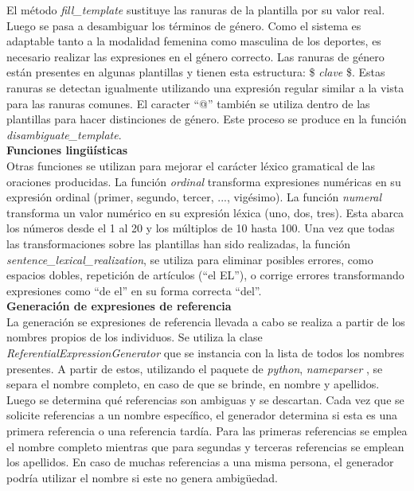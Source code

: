   El método \emph{fill\_template} sustituye las ranuras de la plantilla por su valor real. Luego se pasa a desambiguar los términos de género. Como el sistema es 
adaptable tanto a la modalidad femenina como masculina de los deportes, es necesario realizar las expresiones en el género correcto. Las ranuras de género están 
presentes en algunas plantillas y tienen esta estructura: \$ \textit{clave} \$. Estas ranuras se detectan igualmente utilizando una expresión regular similar a la vista 
para las ranuras comunes. El caracter “@” también se utiliza dentro de las plantillas para hacer distinciones de género. Este proceso se produce en la 
función \emph{disambiguate\_template}.\\

\textbf{Funciones lingüísticas}\\

    Otras funciones se utilizan para mejorar el carácter léxico gramatical de las oraciones producidas. La función \emph{ordinal} transforma expresiones numéricas 
en su expresión ordinal (primer, segundo,  tercer, ..., vigésimo). La función \emph{numeral} transforma un valor numérico en su expresión léxica (uno, dos, tres). Esta 
abarca los números desde el 1 al 20 y los múltiplos de 10 hasta 100. Una vez que todas las transformaciones sobre las plantillas han sido realizadas, la función 
\emph{sentence\_lexical\_realization}, se utiliza para eliminar posibles errores, como espacios dobles, repetición de artículos (“el EL”), o corrige errores 
transformando expresiones como “de el” en su forma correcta “del”.\\


\textbf{Generación de expresiones de referencia}\\

    La generación se expresiones de referencia llevada a cabo se realiza a partir de los nombres propios de los individuos. Se utiliza la clase 
\emph{ReferentialExpressionGenerator} que se instancia con la lista de todos los nombres presentes. A partir de estos, utilizando el paquete de \textit{python}, 
\emph{nameparser} , se separa el nombre completo, en caso de que se brinde, en nombre y apellidos. Luego se determina qué referencias son ambiguas 
y se descartan. Cada vez que se solicite referencias a un nombre específico, el generador determina si esta es una primera referencia o una referencia tardía. Para 
las primeras referencias se emplea el nombre completo mientras que para segundas y terceras referencias se emplean los apellidos. En caso de muchas referencias a una 
misma persona, el generador podría utilizar el nombre si este no genera ambigüedad.


